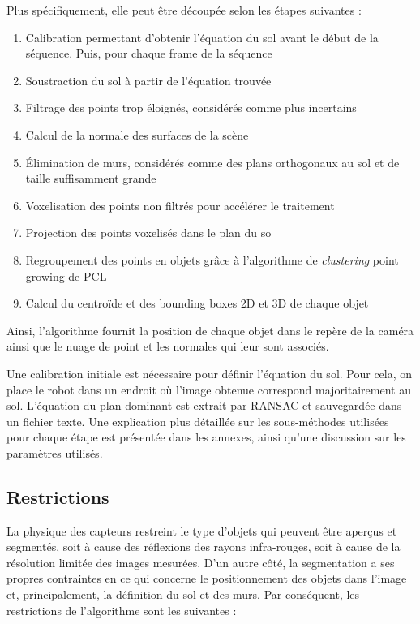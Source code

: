 Plus spécifiquement, elle peut être découpée selon les étapes suivantes :
\begin{enumerate}[start=0]
\item Calibration permettant d'obtenir l'équation du sol avant le début de la séquence. Puis, pour chaque frame de la séquence
\item Soustraction du sol à partir de l'équation trouvée
\item Filtrage des points trop éloignés, considérés comme plus incertains
\item Calcul de la normale des surfaces de la scène
\item Élimination de murs, considérés comme des plans orthogonaux au sol et de taille suffisamment grande
\item Voxelisation des points non filtrés pour accélérer le traitement
\item Projection des points voxelisés dans le plan du so
\item Regroupement des points en objets grâce à l'algorithme de \textit{clustering} point growing de PCL
\item Calcul du centroïde et des bounding boxes 2D et 3D de chaque objet
\end{enumerate}

Ainsi, l'algorithme fournit la position de chaque objet dans le repère de la caméra ainsi que le nuage de point et les normales qui leur sont associés.

Une calibration initiale est nécessaire pour définir l'équation du sol. Pour cela, on place le robot dans un endroit où l'image obtenue correspond majoritairement au sol. L’équation du plan dominant est extrait par RANSAC et sauvegardée dans un fichier texte. Une explication plus détaillée sur les sous-méthodes utilisées pour chaque étape est présentée dans les annexes, ainsi qu'une discussion sur les paramètres utilisés.


\subsection{Restrictions} 
La physique des capteurs restreint le type d'objets qui peuvent être aperçus et segmentés, soit à cause des réflexions des rayons infra-rouges, soit à cause de la
résolution limitée des images mesurées. D'un autre côté, la segmentation a ses propres contraintes en ce qui concerne le positionnement des objets dans l'image et, principalement, la définition du sol et des murs. Par conséquent, les restrictions de l'algorithme sont les suivantes :

